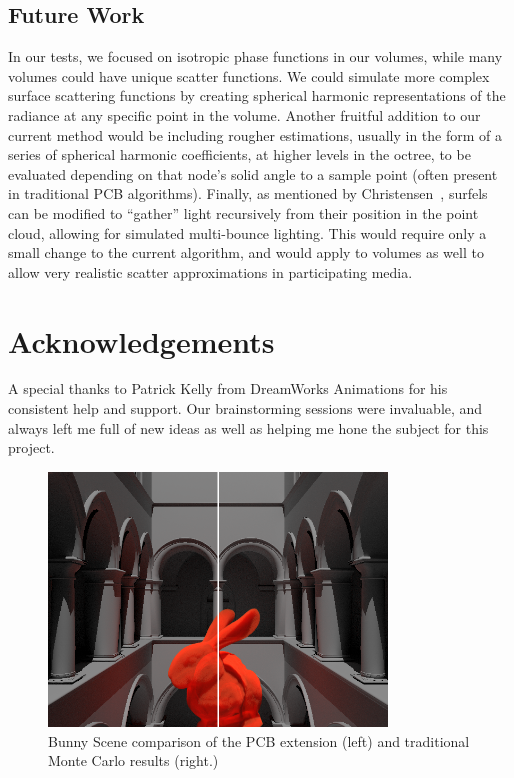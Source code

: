 \documentclass[runningheads]{llncs}
\begin{document}
\subsection{Future Work}

In our tests, we focused on isotropic phase functions in our volumes, while many volumes could have unique scatter functions.  We could simulate more complex surface scattering functions by creating spherical harmonic representations of the radiance at any specific point in the volume.  %
Another fruitful addition to our current method would be including rougher estimations, usually in the form of a series of spherical harmonic coefficients, at higher levels in the octree, to be evaluated depending on that node's solid angle to a sample point (often present in traditional PCB algorithms). Finally, as mentioned by Christensen~\cite{christensen:2008}, surfels can be modified to ``gather'' light recursively from their position in the point cloud, allowing for simulated multi-bounce lighting.  This would require only a small change to the current algorithm, and would apply to volumes as well to allow very realistic scatter approximations in participating media.


\section*{Acknowledgements}
A special thanks to Patrick Kelly from DreamWorks Animations for his consistent help and support.  Our brainstorming sessions were invaluable, and always left me full of new ideas as well as helping me hone the subject for this project.





\begin{figure}[]
    \centering
    \includegraphics[width=90mm]{img/compare.png}
    \caption{Bunny Scene comparison of the PCB extension (left) and traditional Monte Carlo results (right.)}
    \label{fig:compare1}
\end{figure}
\end{document}
